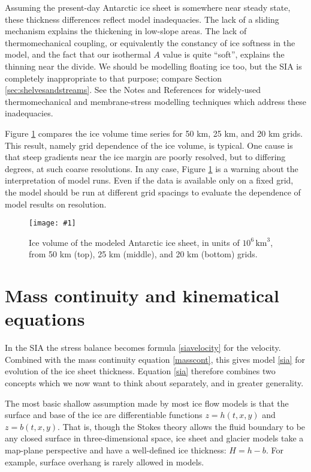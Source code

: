 \documentclass[letterpaper,final,12pt,reqno]{amsart}
\newcommand{\onefigsize}[3]{
\begin{figure}[ht]
\centering
\texttt{[image: \#1]}
\caption{#2}
\label{fig:#1}
\end{figure}}
\newcommand{\onefig}[2]{\onefigsize{#1}{#2}{3.0in}}
\begin{document}
Assuming the present-day Antarctic ice sheet is somewhere near steady state, these thickness differences reflect model inadequacies.  The lack of a sliding mechanism explains the thickening in low-slope areas.  The lack of thermomechanical coupling, or equivalently the constancy of ice softness in the model, and the fact that our isothermal $A$ value is quite ``soft'', explains the thinning near the divide.  We should be modelling floating ice too, but the SIA is completely inappropriate to that purpose; compare Section \ref{sec:shelvesandstreams}.  See the Notes and References for widely-used thermomechanical and membrane-stress modelling techniques which address these inadequacies.

Figure \ref{fig:antvolcompare} compares the ice volume time series for 50 km, 25 km, and 20 km grids.  This result, namely grid dependence of the ice volume, is typical.  One cause is that steep gradients near the ice margin are poorly resolved, but to differing degrees, at such coarse resolutions.  In any case, Figure \ref{fig:antvolcompare} is a warning about the interpretation of model runs.  Even if the data is available only on a fixed grid, the model should be run at different grid spacings to evaluate the dependence of model results on resolution.

\medskip
\onefig{antvolcompare}{Ice volume of the modeled Antarctic ice sheet, in units of $10^6 \, \text{km}^3$, from 50 km (top), 25 km (middle), and 20 km (bottom) grids.}


\section{Mass continuity and kinematical equations}   \label{sec:masscont}

In the SIA the stress balance becomes formula \eqref{siavelocity} for the velocity.  Combined with the mass continuity equation \eqref{masscont}, this gives model \eqref{sia} for evolution of the ice sheet thickness.  Equation \eqref{sia} therefore combines two concepts which we now want to think about separately, and in greater generality.

The most basic shallow assumption made by most ice flow models is that the surface and base of the ice are differentiable functions $z=h(t,x,y)$ and $z=b(t,x,y)$.  That is, though the Stokes theory allows the fluid boundary to be any closed surface in three-dimensional space, ice sheet and glacier models take a map-plane perspective and have a well-defined ice thickness: $H=h-b$.  For example, surface overhang is rarely allowed in models.
\end{document}
